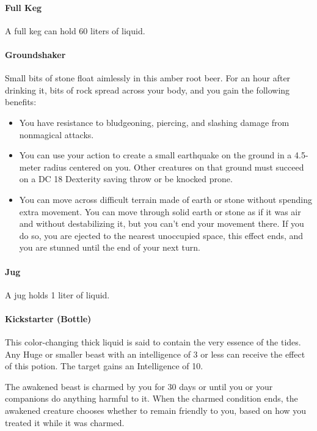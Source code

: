     \paragraph{Full Keg}
        A full keg can hold 60 liters of liquid.
    \paragraph{Groundshaker} %
        Small bits of stone float aimlessly in this amber root beer.
        For an hour after drinking it, bits of rock spread across your body, and you gain the following benefits:
        \begin{itemize}
            \item You have resistance to bludgeoning, piercing, and slashing damage from nonmagical attacks.
            \item You can use your action to create a small earthquake on the ground in a 4.5-meter radius centered on you.
            Other creatures on that ground must succeed on a DC 18 Dexterity saving throw or be knocked prone.
            \item You can move across difficult terrain made of earth or stone without spending extra movement.
            You can move through solid earth or stone as if it was air and without destabilizing it, but you can't end your movement there.
            If you do so, you are ejected to the nearest unoccupied space, this effect ends, and you are stunned until the end of your next turn.
        \end{itemize}
    \paragraph{Jug}
        A jug holds 1 liter of liquid.
    \paragraph{Kickstarter (Bottle)} %
        This color-changing thick liquid is said to contain the very essence of the tides.
        Any Huge or smaller beast with an intelligence of 3 or less can receive the effect of this potion.
        The target gains an Intelligence of 10.

        The awakened beast is charmed by you for 30 days or until you or your companions do anything harmful to it.
        When the charmed condition ends, the awakened creature chooses whether to remain friendly to you, based on how you treated it while it was charmed.

